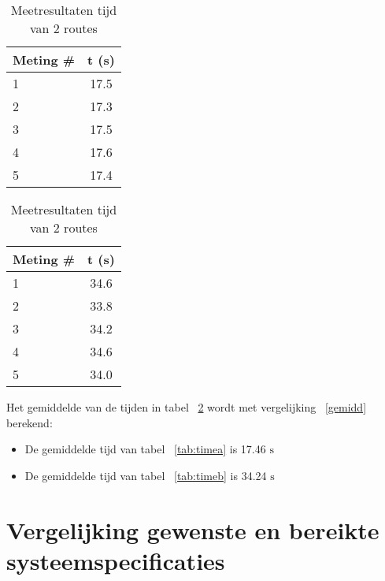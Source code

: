 \documentclass{report}
\begin{document}
\begin{table}
	\centering
	\begin{subtable}[H]{0.40\textwidth}
		\centering
			\begin{tabular}{| l| c|}
		\hline
		   Meting \# & t (s) \\
		\hline
		   1& 17.5 \\
		\hline
		   2& 17.3 \\
		\hline
		   3& 17.5 \\
		\hline
		   4& 17.6 \\
		\hline
		   5& 17.4 \\
		\hline
		\end{tabular}
		\label{tab:timea}
	\end{subtable}
	\quad
	\begin{subtable}[H]{0.40\textwidth}
		\centering
		\begin{tabular}{| l| c|}
		\hline
		   Meting \# & t (s) \\
		\hline
		   1& 34.6\\
		\hline
		   2& 33.8\\
		\hline
		   3& 34.2\\
		\hline
		  4& 34.6\\
		\hline
		   5& 34.0 \\
		\hline
		\end{tabular}
		\label{tab:timeb}
	\end{subtable}
	\caption{Meetresultaten tijd van 2 routes}
	\label{tab:measurementtime}
\end{table}

Het gemiddelde van de tijden in tabel ~\ref{tab:measurementtime} wordt met vergelijking ~\ref{gemidd} berekend:
\begin{itemize}
\item De gemiddelde tijd van tabel ~\ref{tab:timea} is 17.46 $\mathrm{s}$
\item De gemiddelde tijd van tabel ~\ref{tab:timeb} is 34.24 $\mathrm{s}$
\end{itemize}

\section{Vergelijking gewenste en bereikte systeemspecificaties}
\label{sec:vergelijking_specs}
\end{document}
